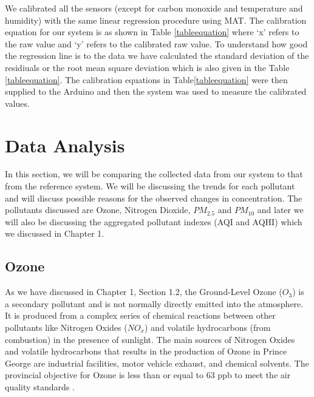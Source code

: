  We calibrated all the sensors (except for carbon monoxide and temperature and humidity) with the same linear regression procedure using MAT. 
 The calibration equation for our system is as shown in Table \ref{tableequation} where {\lq x\rq} refers to the raw value and {\lq y\rq }  refers to the calibrated raw value. To understand how good the regression line is to the data we have calculated the standard deviation of the residiuals or the root mean square deviation which is also given in the Table \ref{tableequation}. The calibration equations in Table\ref{tableequation} were then supplied to the Arduino and then the system was used to measure the calibrated values.%







   
   \section{Data Analysis}
  
  In this section, we will be comparing the collected data from our system to that from the reference system. We will be discussing the trends for each pollutant and will discuss possible reasons for the observed changes in concentration. The pollutants discussed are Ozone, Nitrogen Dioxide, $PM_{2.5}$ and $PM_{10}$ and later we will also be discussing the aggregated pollutant indexes (AQI and AQHI) which we discussed in Chapter 1.
  
  
  
  \subsection{Ozone}
As we have discussed in Chapter 1, Section 1.2,  the Ground-Level Ozone ($O_3$) is a secondary pollutant and is not normally directly emitted into the atmosphere. It is produced from a complex series of chemical reactions between other pollutants like Nitrogen Oxides (${NO_x}$) and volatile hydrocarbons (from combustion) in the presence of sunlight\cite{Environment2016}. The main sources of Nitrogen Oxides and volatile hydrocarbons that results in the production of Ozone in Prince George are industrial facilities, motor vehicle exhaust, and chemical solvents. The provincial objective for Ozone is less than or equal to 63 ppb to meet the air quality standards \cite{Environment2016}. 



